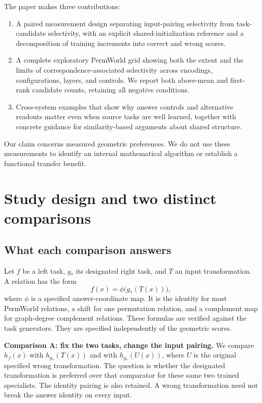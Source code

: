 \documentclass[10pt]{article}
\begin{document}
The paper makes three contributions:
\begin{enumerate}
\item A paired measurement design separating input-pairing selectivity from
task-candidate selectivity, with an explicit shared-initialization reference
and a decomposition of training increments into correct and wrong scores.
\item A complete exploratory PermWorld grid showing both the extent and the
limits of correspondence-associated selectivity across encodings,
configurations, layers, and controls. We report both above-mean and first-rank
candidate counts, retaining all negative conditions.
\item Cross-system examples that show why answer controls and alternative
readouts matter even when source tasks are well learned, together with
concrete guidance for similarity-based arguments about shared structure.
\end{enumerate}
Our claim concerns measured geometric preferences. We do not use these
measurements to identify an internal mathematical algorithm or establish a
functional transfer benefit.



\section{Study design and two distinct comparisons}
\label{sec:design}
\subsection{What each comparison answers}
Let $f$ be a left task, $g_*$ its designated right task, and $T$ an input
transformation. A relation has the form
\begin{equation}
 f(x)=\phi\bigl(g_*(T(x))\bigr),
 \label{eq:identity}
\end{equation}
where $\phi$ is a specified answer-coordinate map. It is the identity for most
PermWorld relations, a shift for one permutation relation, and a complement
map for graph-degree complement relations. These formulas are verified
against the task generators. They are specified independently of the
geometric scores.

\textbf{Comparison A: fix the two tasks, change the input pairing.}
We compare $h_f(x)$ with $h_{g_*}(T(x))$ and with
$h_{g_*}(U(x))$, where $U$ is the original specified wrong transformation.
The question is whether the designated transformation is preferred over
that comparator for these same two trained specialists. The identity
pairing is also retained. A wrong transformation need not break the
answer identity on every input.
\end{document}
